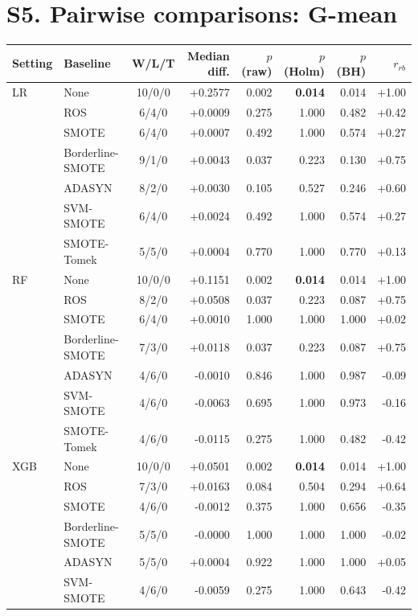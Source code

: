 \documentclass[10pt,a4paper]{article}
\begin{document}
\section*{S5. Pairwise comparisons: G-mean}
\begin{center}\footnotesize\begin{longtable}{@{}llcrrrrr@{}}\toprule Setting & Baseline & W/L/T & Median diff. & $p$ (raw) & $p$ (Holm) & $p$ (BH) & $r_{rb}$ \\ \midrule\endhead
LR & None & 10/0/0 & +0.2577 & 0.002 & \textbf{0.014} & 0.014 & +1.00 \\
 & ROS & 6/4/0 & +0.0009 & 0.275 & 1.000 & 0.482 & +0.42 \\
 & SMOTE & 6/4/0 & +0.0007 & 0.492 & 1.000 & 0.574 & +0.27 \\
 & Borderline-SMOTE & 9/1/0 & +0.0043 & 0.037 & 0.223 & 0.130 & +0.75 \\
 & ADASYN & 8/2/0 & +0.0030 & 0.105 & 0.527 & 0.246 & +0.60 \\
 & SVM-SMOTE & 6/4/0 & +0.0024 & 0.492 & 1.000 & 0.574 & +0.27 \\
 & SMOTE-Tomek & 5/5/0 & +0.0004 & 0.770 & 1.000 & 0.770 & +0.13 \\
\midrule
RF & None & 10/0/0 & +0.1151 & 0.002 & \textbf{0.014} & 0.014 & +1.00 \\
 & ROS & 8/2/0 & +0.0508 & 0.037 & 0.223 & 0.087 & +0.75 \\
 & SMOTE & 6/4/0 & +0.0010 & 1.000 & 1.000 & 1.000 & +0.02 \\
 & Borderline-SMOTE & 7/3/0 & +0.0118 & 0.037 & 0.223 & 0.087 & +0.75 \\
 & ADASYN & 4/6/0 & -0.0010 & 0.846 & 1.000 & 0.987 & -0.09 \\
 & SVM-SMOTE & 4/6/0 & -0.0063 & 0.695 & 1.000 & 0.973 & -0.16 \\
 & SMOTE-Tomek & 4/6/0 & -0.0115 & 0.275 & 1.000 & 0.482 & -0.42 \\
\midrule
XGB & None & 10/0/0 & +0.0501 & 0.002 & \textbf{0.014} & 0.014 & +1.00 \\
 & ROS & 7/3/0 & +0.0163 & 0.084 & 0.504 & 0.294 & +0.64 \\
 & SMOTE & 4/6/0 & -0.0012 & 0.375 & 1.000 & 0.656 & -0.35 \\
 & Borderline-SMOTE & 5/5/0 & -0.0000 & 1.000 & 1.000 & 1.000 & -0.02 \\
 & ADASYN & 5/5/0 & +0.0004 & 0.922 & 1.000 & 1.000 & +0.05 \\
 & SVM-SMOTE & 4/6/0 & -0.0059 & 0.275 & 1.000 & 0.643 & -0.42 \\

\end{longtable}
\end{center}
\end{document}
